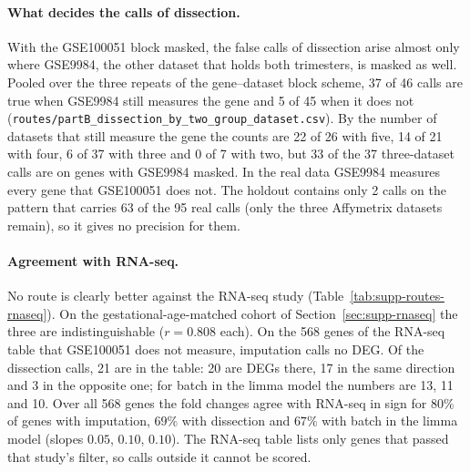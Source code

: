 \documentclass[11pt,a4paper]{article}
\begin{document}
\paragraph{What decides the calls of dissection.}
With the GSE100051 block masked, the false calls of dissection arise
almost only where GSE9984, the other dataset that holds both
trimesters, is masked as well. Pooled over the three repeats of the
gene--dataset block scheme, 37 of 46 calls are true when GSE9984
still measures the gene and 5 of 45 when it does not
(\texttt{routes/partB\_dissection\_by\_two\_group\_dataset.csv}). By
the number of datasets that still measure the gene the counts are 22
of 26 with five, 14 of 21 with four, 6 of 37 with three and 0 of 7
with two, but 33 of the 37 three-dataset calls are on genes with
GSE9984 masked. In the real data GSE9984 measures every gene that
GSE100051 does not. The holdout contains only 2 calls on the pattern
that carries 63 of the 95 real calls (only the three Affymetrix
datasets remain), so it gives no precision for them.

\paragraph{Agreement with RNA-seq.}
No route is clearly better against the RNA-seq study
(Table~\ref{tab:supp-routes-rnaseq}). On the gestational-age-matched
cohort of Section~\ref{sec:supp-rnaseq} the three are
indistinguishable ($r = 0.808$ each). On the 568 genes of the
RNA-seq table that GSE100051 does not measure, imputation calls no
DEG. Of the dissection calls, 21 are in the table: 20 are DEGs
there, 17 in the same direction and 3 in the opposite one; for
batch in the limma model the numbers are 13, 11 and 10. Over all
568 genes the fold changes agree with RNA-seq in sign for $80\%$ of
genes with imputation, $69\%$ with dissection and $67\%$ with batch
in the limma model (slopes $0.05$, $0.10$, $0.10$). The RNA-seq
table lists only genes that passed that study's filter, so calls
outside it cannot be scored.
\end{document}
